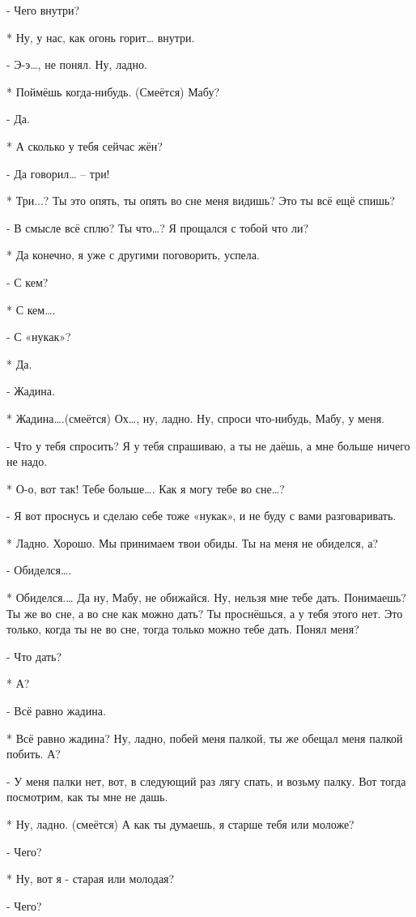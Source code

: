 - Чего внутри?

* Ну, у нас, как огонь горит… внутри.

- Э-э…, не понял. Ну, ладно.

* Поймёшь когда-нибудь.  (Смеётся) Мабу?

- Да.

* А сколько у тебя сейчас жён?

- Да говорил… – три!

* Три...?  Ты это опять, ты опять во сне меня  видишь? Это ты всё ещё спишь?

- В смысле всё  сплю? Ты что…? Я прощался с тобой что ли? 

* Да конечно, я уже с другими поговорить, успела.

- С кем?

* С кем….

- С «нукак»?

* Да.

- Жадина.

* Жадина….(смеётся) Ох…,  ну, ладно. Ну, спроси что-нибудь, Мабу, у меня.

- Что у тебя спросить? Я у тебя спрашиваю, а ты не даёшь, а мне больше ничего не надо.

* О-о, вот так! Тебе больше…. Как я могу тебе во сне…?

- Я вот проснусь и сделаю себе тоже «нукак», и не буду с вами разговаривать.

* Ладно. Хорошо. Мы принимаем твои обиды. Ты на меня не обиделся, а?

- Обиделся….

* Обиделся.… Да ну, Мабу, не обижайся. Ну, нельзя мне тебе дать. Понимаешь? Ты же во сне, а во сне как можно дать? Ты проснёшься, а у тебя этого нет. Это только, когда ты не во сне, тогда только можно тебе дать. Понял меня?

- Что дать?

* А?

- Всё равно жадина.

* Всё равно жадина? Ну, ладно, побей меня палкой, ты же обещал меня палкой побить. А?

- У меня палки нет, вот, в следующий раз лягу спать, и возьму  палку. Вот тогда посмотрим, как ты мне не дашь.

* Ну, ладно. (смеётся) А как ты думаешь, я старше тебя или моложе?

- Чего?

* Ну, вот я - старая или молодая?

- Чего?

